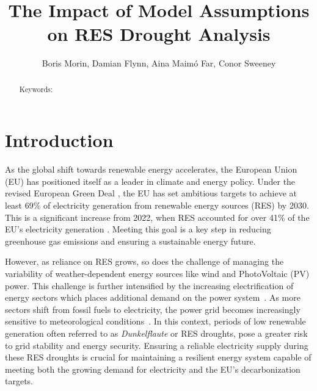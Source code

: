 \documentclass[a4paper, 11pt]{article}
\title{The Impact of Model Assumptions on RES Drought Analysis}
\author{Boris Morin, Damian Flynn, Aina Maimó Far, Conor Sweeney}
\begin{document}
\maketitle

\begin{abstract}


Keywords: 
\end{abstract}

\section{Introduction}

As the global shift towards renewable energy accelerates, the European Union (EU) has positioned itself as a leader in climate and energy policy. Under the revised European Green Deal \cite{greendeal2023report}, the EU has set ambitious targets to achieve at least 69\% of electricity generation from renewable energy sources (RES) by 2030. This is a significant increase from 2022, when RES accounted for over 41\% of the EU’s electricity generation \cite{europe2023stat}. Meeting this goal is a key step in reducing greenhouse gas emissions and ensuring a sustainable energy future.

However, as reliance on RES grows, so does the challenge of managing the variability of weather-dependent energy sources like wind and PhotoVoltaic (PV) power. This challenge is further intensified by the increasing electrification of energy sectors which places additional demand on the power system~\cite{bloomfield2021}. As more sectors shift from fossil fuels to electricity, the power grid becomes increasingly sensitive to meteorological conditions~\cite{bloomfield2016, vanderWiel2019drought}. In this context, periods of low renewable generation often referred to as \textit{Dunkelflaute} or RES droughts, pose a greater risk to grid stability and energy security. Ensuring a reliable electricity supply during these RES droughts is crucial for maintaining a resilient energy system capable of meeting both the growing demand for electricity and the EU’s decarbonization targets.
\end{document}
